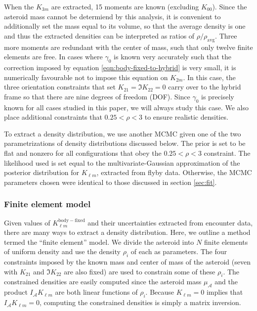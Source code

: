 \documentclass[fleqn,usenatbib]{mnras}
\begin{document}
When the $K_{3m}$ are extracted, 15 moments are known (excluding $K_{00}$). Since the asteroid mass cannot be determiend by this analysis, it is convenient to additionally set the mass equal to its volume, so that the average density is one and thus the extracted densities can be interpreted as ratios of $\rho / \rho_\text{avg}$. Three more moments are redundant with the center of mass, such that only twelve finite elements are free. In cases where $\gamma_0$ is known very accurately such that the correction imposed by equation \ref{eqn:body-fixed-to-hybrid} is very small, it is numerically favourable not to impose this equation on $K_{2m}$. In this case, the three orientation constraints that set $K_{21}=\Im K_{22} = 0$ carry over to the hybrid frame so that there are nine degrees of freedom (DOF). Since $\gamma_0$ is precisely known for all cases studied in this paper, we will always study this case. We also place additional constraints that $0.25 < \rho < 3$ to ensure realistic densities.

To extract a density distribution, we use another MCMC given one of the two parametrizations of density distributions discussed below. The prior is set to be flat and nonzero for all configurations that obey the $0.25 < \rho < 3$ constraint. The likelihood used is set equal to the multivariate-Gaussian approximation of the posterior distribution for $K_{\ell m}$, extracted from flyby data. Otherwise, the MCMC parameters chosen were identical to those discussed in section \ref{sec:fit}.



\subsubsection{Finite element model}

Given values of $K_{\ell m}^\mathrm{body-fixed}$ and their uncertainties extracted from encounter data, there are many ways to extract a density distribution. Here, we outline a method termed the ``finite element'' model. We divide the asteroid into $N$ finite elements of uniform density and use the density $\rho_i$ of each as parameters. The four constraints imposed by the known mass and center of mass of the asteroid (seven with $K_{21}$ and $\Im K_{22}$ are also fixed) are used to constrain some of these $\rho_i$. The constrained densities are easily computed since the asteroid mass $\mu_\mathcal{A}$ and the product $I_\mathcal{A}K_{\ell m}$ are both linear functions of $\rho_i$. Because $K_{\ell m} = 0$ implies that $I_\mathcal{A}K_{\ell m} = 0$, computing the constrained densities is simply a matrix inversion.
\end{document}
